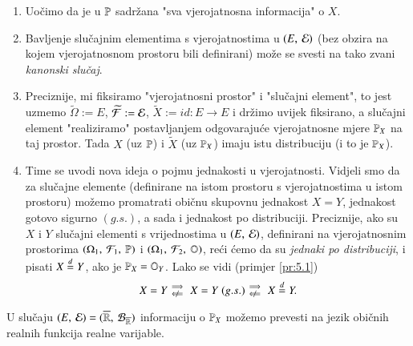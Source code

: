 \begin{nap} \label{nap:5.3}
    \begin{enumerate}[label=(\alph*)]
        \item Uo\v cimo da je u $\mathbb{P}$ sadr\v zana "sva vjerojatnosna informacija" o $X$.
        \item Bavljenje slu\v cajnim elementima s vjerojatnostima u $({E}, \: {\mathcal{E}})$ (bez obzira na kojem vjerojatnosnom prostoru bili definirani) mo\v ze se svesti na tako zvani \emph{kanonski slu\v caj}.
        \item Preciznije, mi fiksiramo "vjerojatnosni prostor" i "slu\v cajni element", to jest uzmemo $\widetilde{\Omega} := E$, $\widetilde{\mathcal{F}} := \mathcal{E}$, $\widetilde{X} := id : E \to E$ i dr\v zimo uvijek fiksirano, a slu\v cajni element "realiziramo" postavljanjem odgovaraju\' ce vjerojatnosne mjere $\mathbb{P}_X$ na taj prostor.
        Tada $X$ (uz $\mathbb{P}$) i $\widetilde{X}$ (uz $\mathbb{P}_X$) imaju istu distribuciju (i to je $\mathbb{P}_X$).
        \item Time se uvodi nova ideja o pojmu jednakosti u vjerojatnosti.
        Vidjeli smo da za slu\v cajne elemente (definirane na istom prostoru s vjerojatnostima u istom prostoru) mo\v zemo promatrati obi\v cnu skupovnu jednakost $X = Y$, jednakost gotovo sigurno $(g.s.)$, a sada i jednakost po distribuciji.
        Preciznije, ako su $X$ i $Y$ slu\v cajni elementi s vrijednostima u $({E}, \: {\mathcal{E}})$, definirani na vjerojatnosnim prostorima $(\Omega_1, \: \mathcal{F}_1, \: \mathbb{P})$ i $(\Omega_1, \: \mathcal{F}_2, \: \mathbb{O})$, re\' ci \' cemo da su \emph{jednaki po distribuciji}, i pisati $X \overset{d}{=} Y$, ako je $\mathbb{P}_X = \mathbb{O}_Y$.
        Lako se vidi (primjer \ref{pr:5.1})
        \begin{equation*}
            X = Y
            \begin{smallmatrix}
                \implies&  \\
                \notimpliedby&
            \end{smallmatrix}
            X = Y \; (g.s.)
            \begin{smallmatrix}
                \implies&  \\
                \notimpliedby&
            \end{smallmatrix}
            X \distJed Y.
        \end{equation*}
    \end{enumerate}
\end{nap}

U slu\v caju $({E}, \: {\mathcal{E}}) = ({\overline{\mathbb{R}}}, \: {\mathcal{B}_{\overline{\mathbb{R}}}})$ informaciju o $\mathbb{P}_X$ mo\v zemo prevesti na jezik obi\v cnih realnih funkcija realne varijable.

